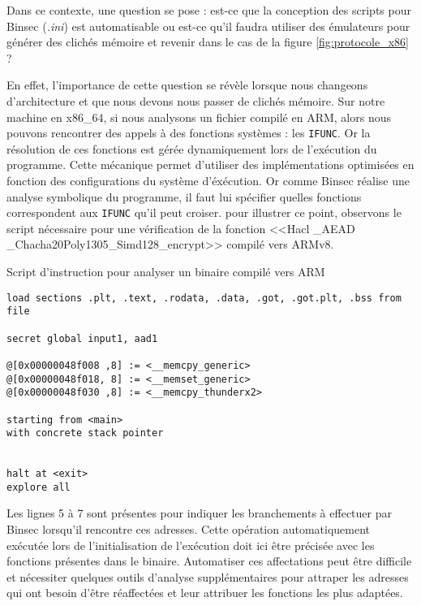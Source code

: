 Dans ce contexte, une question se pose : est-ce que la conception des scripts pour Binsec (\textit{.ini}) est automatisable ou est-ce qu'il faudra utiliser des émulateurs pour générer des clichés mémoire et revenir dans le cas de la figure \ref{fig:protocole_x86} ?\smallbreak

En effet, l'importance de cette question se révèle lorsque nous changeons d'architecture et que nous devons nous passer de clichés mémoire. Sur notre machine en x86\_64, si nous analysons un fichier compilé en ARM, alors nous pouvons rencontrer des appels à des fonctions systèmes : les \texttt{IFUNC}. Or la résolution de ces fonctions est gérée dynamiquement lors de l'exécution du programme. Cette mécanique permet d'utiliser des implémentations optimisées en fonction des configurations du système d'éxécution. Or comme Binsec réalise une analyse symbolique du programme, il faut lui spécifier quelles fonctions correspondent aux \texttt{IFUNC} qu'il peut croiser. pour illustrer ce point, observons le script nécessaire pour une vérification de la fonction <<Hacl \_AEAD \_Chacha20Poly1305\_Simd128\_encrypt>> compilé vers ARMv8.

\begin{listing}[!ht]
    \caption{Script d'instruction pour analyser un binaire compilé vers ARM}
    \label{lst:script_arm_exemple}
    \begin{verbatim}
load sections .plt, .text, .rodata, .data, .got, .got.plt, .bss from file

secret global input1, aad1

@[0x00000048f008 ,8] := <__memcpy_generic>
@[0x00000048f018, 8] := <__memset_generic>
@[0x00000048f030 ,8] := <__memcpy_thunderx2>

starting from <main>
with concrete stack pointer


halt at <exit>
explore all 
    \end{verbatim}
\end{listing}

Les lignes 5 à 7 sont présentes pour indiquer les branchements à effectuer par Binsec lorsqu'il rencontre ces adresses. Cette opération automatiquement exécutée lors de l'initialisation de l'exécution doit ici être précisée avec les fonctions présentes dans le binaire. Automatiser ces affectations peut être difficile et nécessiter quelques outils d'analyse supplémentaires pour attraper les adresses qui ont besoin d'être réaffectées et leur attribuer les fonctions les plus adaptées.\medbreak


